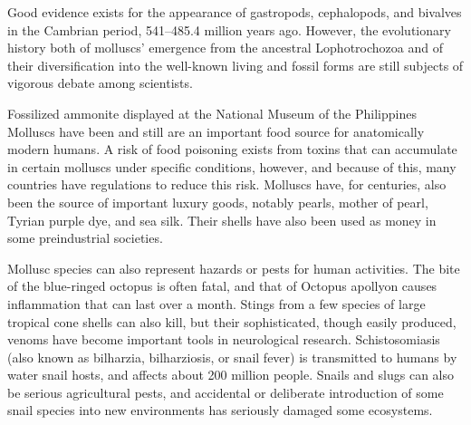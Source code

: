 Good evidence exists for the appearance of gastropods, cephalopods, and bivalves in the Cambrian period, 541--485.4 million years ago. However, the evolutionary history both of molluscs' emergence from the ancestral Lophotrochozoa and of their diversification into the well-known living and fossil forms are still subjects of vigorous debate among scientists.

Fossilized ammonite displayed at the National Museum of the Philippines
Molluscs have been and still are an important food source for anatomically modern humans. A risk of food poisoning exists from toxins that can accumulate in certain molluscs under specific conditions, however, and because of this, many countries have regulations to reduce this risk. Molluscs have, for centuries, also been the source of important luxury goods, notably pearls, mother of pearl, Tyrian purple dye, and sea silk. Their shells have also been used as money in some preindustrial societies.

Mollusc species can also represent hazards or pests for human activities. The bite of the blue-ringed octopus is often fatal, and that of Octopus apollyon causes inflammation that can last over a month. Stings from a few species of large tropical cone shells can also kill, but their sophisticated, though easily produced, venoms have become important tools in neurological research. Schistosomiasis (also known as bilharzia, bilharziosis, or snail fever) is transmitted to humans by water snail hosts, and affects about 200 million people. Snails and slugs can also be serious agricultural pests, and accidental or deliberate introduction of some snail species into new environments has seriously damaged some ecosystems.

\onecolumn

